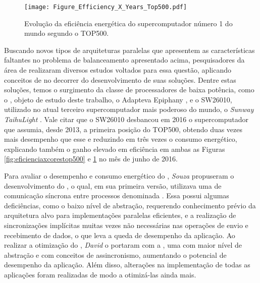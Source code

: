 \begin{figure}[tb]
  \centering
  \caption{Evolução da eficiência energética do supercomputador número 1 do mundo segundo o \ranking TOP500.}
  \label{fig:eficienciaxyearstop500}
  \texttt{[image: Figure\_Efficiency\_X\_Years\_Top500.pdf]}
\end{figure}

Buscando novos tipos de arquiteturas paralelas que apresentem as características faltantes no problema de balanceamento apresentado acima, pesquisadores da área de \HPC realizaram diversos estudos voltados para essa questão, aplicando conceitos de \greencomputing \cite{greencomputingacm} no decorrer do desenvolvimento de suas soluções. Dentre estas soluções, temos o surgimento da classe de processadores \manycore de baixa potência, como o \mppa \cite{mppa2562013}, objeto de estudo deste trabalho, o Adapteva Epiphany \cite{olofsson2014}, e o SW26010, utilizado no atual terceiro supercomputador mais poderoso do mundo, o \textit{Sunway TaihuLight} \cite{fu2016sunway}. Vale citar que o SW26010 desbancou em 2016 o supercomputador que assumia, desde 2013, a primeira posição do \ranking TOP500, obtendo duas vezes mais desempenho que esse e reduzindo em três vezes o consumo energético, explicando também o ganho elevado em eficiência em ambas as Figuras \ref{fig:eficienciaxcorestop500} e \ref{fig:eficienciaxyearstop500} no mês de junho de 2016.

Para avaliar o desempenho e consumo energético do \mppa, \textit{Souza} \etal \cite{astro-Souza-CCPE:2016} propuseram o desenvolvimento do \bench \capb, o qual, em sua primeira versão, utilizava uma \API de comunicação síncrona entre processos denominada \IPC \cite{mppa2562013}. Essa \API possui algumas deficiências, como o baixo nível de abstração, requerendo conhecimento prévio da arquitetura alvo para implementações paralelas eficientes, e a realização de sincronizações implícitas muitas vezes não necessárias nas operações de envio e recebimento de dados, o que leva a queda de desempenho da aplicação. Ao realizar a otimização do \bench, \textit{David} \etal o portaram com a \ASYNC, uma \API com maior nível de abstração e com conceitos de assincronismo, aumentando o potencial de desempenho da aplicação. Além disso, alterações na implementação de todas as aplicações foram realizadas de modo a otimizá-las ainda mais.

